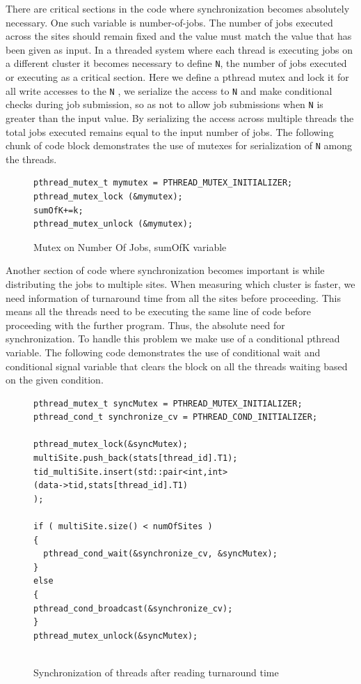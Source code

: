 \documentclass[ms,electronic,double]{nuthesis}
\begin{document}
There are critical sections in the code where synchronization becomes absolutely 
necessary. One such variable is number-of-jobs. The number of jobs executed across 
the sites should remain fixed and the value must match the value that has been 
given as input. In a threaded system where each thread is executing jobs on a 
different cluster it becomes necessary to define \texttt{N}, the number of jobs executed or executing as a 
critical section. Here we define a pthread mutex and lock it for all write accesses to the \texttt{N}
, we serialize the access to \texttt{N} and make conditional checks during job submission, so as not to allow
job submissions when \texttt{N} is greater than the input value. By 
serializing the access across multiple threads the total jobs executed remains 
equal to the input number of jobs. The following chunk of code block 
demonstrates the use of mutexes for serialization of  \texttt{N} among the threads.

\begin{figure}[htbp!]

\begin{lstlisting}
pthread_mutex_t mymutex = PTHREAD_MUTEX_INITIALIZER;
pthread_mutex_lock (&mymutex);
sumOfK+=k;
pthread_mutex_unlock (&mymutex);
\end{lstlisting}

\caption{Mutex on Number Of Jobs, sumOfK variable}
\label{fig:mutex}

\end{figure}


Another section of code where synchronization becomes important is while 
distributing the jobs to multiple sites. When measuring which cluster is 
faster, we need information of turnaround time from all the sites 
before proceeding. This means all the threads need to be executing the same line of code 
before proceeding with the further program. Thus, the absolute need for 
synchronization. To handle this problem we make use of a conditional pthread variable. The following code demonstrates the use of conditional wait 
and conditional signal variable that clears the block on all the threads waiting 
based on the given condition.


\begin{figure}[htbp!]

\begin{lstlisting}
pthread_mutex_t syncMutex = PTHREAD_MUTEX_INITIALIZER;
pthread_cond_t synchronize_cv = PTHREAD_COND_INITIALIZER;

pthread_mutex_lock(&syncMutex);    
multiSite.push_back(stats[thread_id].T1);	
tid_multiSite.insert(std::pair<int,int>
(data->tid,stats[thread_id].T1)
);
	   
if ( multiSite.size() < numOfSites )
{
  pthread_cond_wait(&synchronize_cv, &syncMutex);
}
else
{		
pthread_cond_broadcast(&synchronize_cv);
}
pthread_mutex_unlock(&syncMutex);
    
\end{lstlisting}
\caption{Synchronization of threads after reading turnaround time}
\label{fig:synchronization}
\end{figure}
\FloatBarrier
\end{document}
